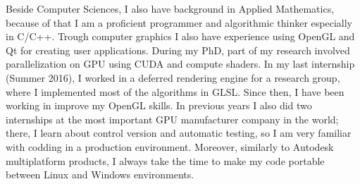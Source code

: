 \documentclass[10pt,stdletter,dateno,sigleft,letterpaper]{newlfm} %
\begin{document}
\begin{newlfm}
Beside Computer Sciences, I also have background in Applied Mathematics, because of that I am a proficient programmer and algorithmic thinker especially in C/C++. Trough computer graphics I also have experience using OpenGL and Qt for creating user applications. During my PhD, part of my research involved parallelization on GPU using CUDA and compute shaders. In my last internship (Summer 2016), I worked in a deferred rendering engine for a research group, where I implemented most of the algorithms in GLSL. Since then, I have been working in improve my OpenGL skills. In previous years I also did two internships at the most important GPU manufacturer company in the world; there, I learn about control version and automatic testing, so I am very familiar with codding in a production environment. Moreover, similarly to Autodesk multiplatform products, I always take the time to make my code portable between Linux and Windows environments.


\end{newlfm}
\end{document}
